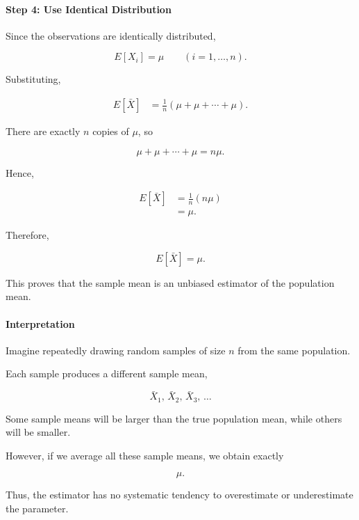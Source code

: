 \documentclass[11pt]{article}
\begin{document}
\begin{mdframed}[
		linewidth=0.8pt,
		roundcorner=6pt,
		backgroundcolor=gray!5,
		linecolor=gray!60,
		innertopmargin=10pt,
		innerbottommargin=10pt,
		innerleftmargin=10pt,
		innerrightmargin=10pt
		]
		\bigskip
		
		\paragraph{Step 4: Use Identical Distribution}
		
		Since the observations are identically distributed,
		
		\[
		E[X_i]=\mu
		\qquad
		(i=1,\ldots,n).
		\]
		
		Substituting,
		
		\[
		\begin{aligned}
			E[\bar X]
			&=
			\frac1n
			(\mu+\mu+\cdots+\mu).
		\end{aligned}
		\]
		
		There are exactly \(n\) copies of \(\mu\), so
		
		\[
		\mu+\mu+\cdots+\mu
		=
		n\mu.
		\]
		
		Hence,
		
		\[
		\begin{aligned}
			E[\bar X]
			&=
			\frac1n(n\mu)
			\\[0.3cm]
			&=
			\mu.
		\end{aligned}
		\]
		
		Therefore,
		
		\[
		\boxed{
			E[\bar X]=\mu.
		}
		\]
		
		This proves that the sample mean is an unbiased estimator of the population
		mean.
		
		\bigskip
		
		\paragraph{Interpretation}
		
		Imagine repeatedly drawing random samples of size \(n\) from the same
		population.
		
		Each sample produces a different sample mean,
		
		\[
		\bar X_1,\,
		\bar X_2,\,
		\bar X_3,\,
		\ldots
		\]
		
		Some sample means will be larger than the true population mean, while others
		will be smaller.
		
		However, if we average all these sample means, we obtain exactly
		
		\[
		\mu.
		\]
		
		Thus, the estimator has no systematic tendency to overestimate or
		underestimate the parameter.
		

\end{mdframed}
\end{document}
